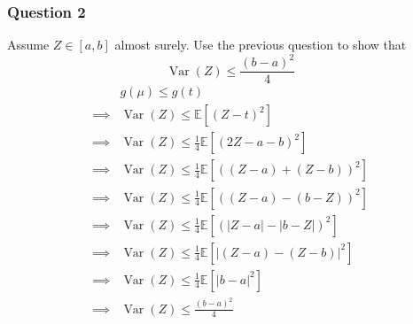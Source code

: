 \documentclass{article}
\newcommand{\E}{\mathbb{E}}
\newcommand{\var}{\operatorname{Var}}
\begin{document}
\subsubsection{Question 2}
Assume \(Z \in \left[a,b\right]\) almost surely. Use the previous question to show that
\begin{equation*}
  \var(Z) \leq \frac{(b-a)^2}{4}
\end{equation*}
\begin{align*}
           &
  g(\mu) \leq g(t)                                                          \\
  \implies &
  \var(Z) \leq \E\left[(Z-t)^2\right]                                       \\
  \implies &
  \var(Z) \leq \frac{1}{4} \E\left[\left(2Z - a - b \right)^2\right]        \\
  \implies &
  \var(Z) \leq \frac{1}{4} \E\left[\left((Z - a) + (Z - b) \right)^2\right] \\
  \implies &
  \var(Z) \leq \frac{1}{4} \E\left[\left((Z - a) - (b - Z) \right)^2\right] \\
  \implies &
  \var(Z) \leq \frac{1}{4} \E\left[\left(|Z - a| - |b - Z| \right)^2\right] \\
  \implies &
  \var(Z) \leq \frac{1}{4} \E\left[\left|(Z - a) - (Z - b)\right|^2\right]  \\
  \implies &
  \var(Z) \leq \frac{1}{4} \E\left[\left|b-a\right|^2\right]                \\
  \implies &
  \var(Z) \leq \frac{\left(b-a\right)^2}{4}                                 \\
\end{align*}
\end{document}
